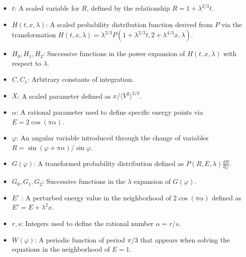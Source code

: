 \documentclass[11pt]{article}
\begin{document}
\begin{itemize}
    \item $t$: A scaled variable for $R$, defined by the relationship $R = 1 + \lambda^{2/3}t$.
    \item $H(t, x, \lambda)$: A scaled probability distribution function derived from $P$ via the transformation $H(t, x, \lambda) = \lambda^{2/3}P(1+\lambda^{2/3}t, 2+\lambda^{4/3}x, \lambda)$.
    \item $H_0, H_1, H_2$: Successive functions in the power expansion of $H(t, x, \lambda)$ with respect to $\lambda$.
    \item $C, C_1$: Arbitrary constants of integration.
    \item $X$: A scaled parameter defined as $x / \langle V^2 \rangle^{2/3}$.
    \item $\alpha$: A rational parameter used to define specific energy points via $E = 2 \cos(\pi\alpha)$.
    \item $\varphi$: An angular variable introduced through the change of variables $R = \sin(\varphi+\pi\alpha)/\sin\varphi$.
    \item $G(\varphi)$: A transformed probability distribution defined as $P(R, E, \lambda) \frac{dR}{d\varphi}$.
    \item $G_0, G_1, G_2$: Successive functions in the $\lambda$ expansion of $G(\varphi)$.
    \item $E'$ : A perturbed energy value in the neighborhood of $2 \cos(\pi\alpha)$ defined as $E' = E + \lambda^2 x$.
    \item $r, s$: Integers used to define the rational number $\alpha = r/s$.
    \item $W(\varphi)$: A periodic function of period $\pi/3$ that appears when solving the equations in the neighborhood of $E=1$.
\end{itemize}

\printbibliography
\end{document}
